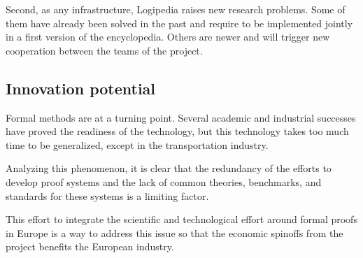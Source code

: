 Second, as any infrastructure, {\sc Logipedia} raises new research
problems. Some of them have already been solved in the past and
require to be implemented jointly in a first version of the
encyclopedia. Others are newer and will trigger new cooperation
between the teams of the project.


\subsection{Innovation potential}

Formal methods are at a turning point. Several academic and
industrial successes have proved the readiness of the technology, but
this technology takes too much time to be generalized, except in the
transportation industry.

Analyzing this phenomenon, it is clear that the redundancy of the
efforts to develop proof systems and the lack of common theories,
benchmarks, and standards for these systems is a limiting factor.

This effort to integrate the scientific and technological effort
around formal proofs in Europe is a way to address this issue so that 
the economic spinoffs from the project benefits the European industry.

